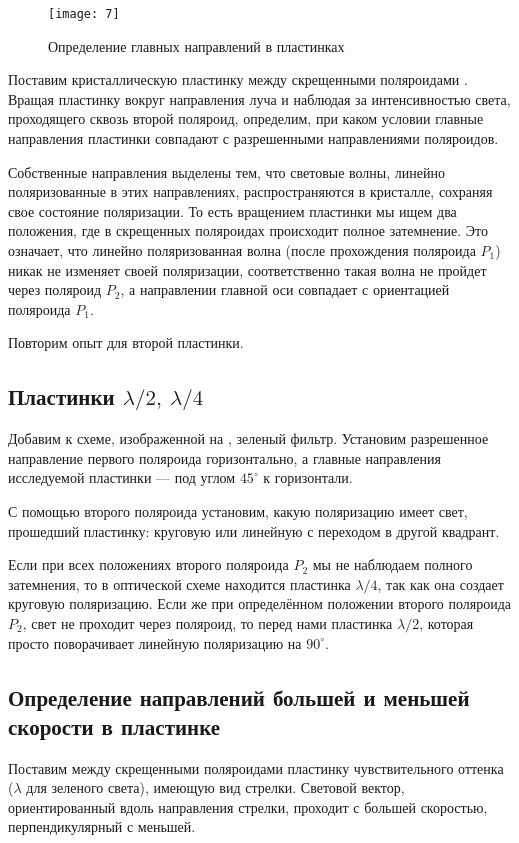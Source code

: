 \documentclass[a4paper, 12pt]{article}
\begin{document}
\begin{wrapfigure}[7]{r}{0.35\linewidth}
    \vspace{-20pt}
    \texttt{[image: 7]}
    \caption{Определение главных направлений в пластинках}
    \label{fig:7}
\end{wrapfigure}

Поставим кристаллическую пластинку между скрещенными поляроидами
. Вращая пластинку вокруг направления луча и наблюдая за
интенсивностью света, проходящего сквозь второй поляроид, определим,
при каком условии главные направления пластинки совпадают с
разрешенными направлениями поляроидов. 

Собственные направления выделены тем, что световые волны, линейно
поляризованные в этих направлениях, распространяются в кристалле,
сохраняя свое состояние поляризации. То есть вращением пластинки мы
ищем два положения, где в скрещенных поляроидах происходит полное
затемнение. Это означает, что линейно поляризованная волна (после
прохождения поляроида $P_1$) никак не изменяет своей поляризации,
соответственно такая волна не пройдет через поляроид $P_2$, а
направлении главной оси совпадает с ориентацией поляроида $P_1$.

Повторим опыт для второй
пластинки.

\subsection*{Пластинки $\lambda/2,\ \lambda/4$}
Добавим к схеме, изображенной на , зеленый фильтр.
Установим разрешенное направление первого поляроида горизонтально, а
главные направления исследуемой пластинки --- под углом $45^\circ$ к
горизонтали. 

С помощью второго поляроида установим, какую поляризацию имеет свет,
прошедший пластинку: круговую или линейную с переходом в другой
квадрант. 

Если при всех положениях второго поляроида $P_2$ мы не наблюдаем полного
затемнения, то в оптической схеме находится пластинка $\lambda/4$, так
как она создает круговую поляризацию. Если же при определённом
положении второго поляроида $P_2$, свет не проходит через поляроид, то
перед нами пластинка $\lambda/2$, которая просто поворачивает линейную
поляризацию на $90^\circ$.

\subsection*{Определение направлений большей и меньшей скорости в
пластинке}
Поставим между скрещенными поляроидами пластинку чувствительного
оттенка ($\lambda$ для зеленого света), имеющую вид стрелки. Световой
вектор, ориентированный вдоль направления стрелки, проходит с большей
скоростью, перпендикулярный с меньшей.
\end{document}
